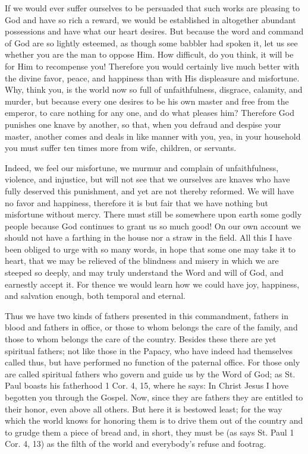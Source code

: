 If we would ever suffer ourselves to be persuaded that such works are
pleasing to God and have so rich a reward, we would be established in
altogether abundant possessions and have what our heart desires. But
because the word and command of God are so lightly esteemed, as though
some babbler had spoken it, let us see whether you are the man to
oppose Him. How difficult, do you think, it will be for Him to
recompense you! Therefore you would certainly live much better with the
divine favor, peace, and happiness than with His displeasure and
misfortune. Why, think you, is the world now so full of unfaithfulness,
disgrace, calamity, and murder, but because every one desires to be his
own master and free from the emperor, to care nothing for any one, and
do what pleases him? Therefore God punishes one knave by another, so
that, when you defraud and despise your master, another comes and deals
in like manner with you, yea, in your household you must suffer ten
times more from wife, children, or servants.

Indeed, we feel our misfortune, we murmur and complain of
unfaithfulness, violence, and injustice, but will not see that we
ourselves are knaves who have fully deserved this punishment, and yet
are not thereby reformed. We will have no favor and happiness,
therefore it is but fair that we have nothing but misfortune without
mercy. There must still be somewhere upon earth some godly people
because God continues to grant us so much good! On our own account we
should not have a farthing in the house nor a straw in the field. All
this I have been obliged to urge with so many words, in hope that some
one may take it to heart, that we may be relieved of the blindness and
misery in which we are steeped so deeply, and may truly understand the
Word and will of God, and earnestly accept it. For thence we would
learn how we could have joy, happiness, and salvation enough, both
temporal and eternal.

Thus we have two kinds of fathers presented in this commandment,
fathers in blood and fathers in office, or those to whom belongs the
care of the family, and those to whom belongs the care of the country.
Besides these there are yet spiritual fathers; not like those in the
Papacy, who have indeed had themselves called thus, but have performed
no function of the paternal office. For those only are called spiritual
fathers who govern and guide us by the Word of God; as St. Paul boasts
his fatherhood 1 Cor. 4, 15, where he says: In Christ Jesus I hove
begotten you through the Gospel. Now, since they are fathers they are
entitled to their honor, even above all others. But here it is bestowed
least; for the way which the world knows for honoring them is to drive
them out of the country and to grudge them a piece of bread and, in
short, they must be (as says St. Paul 1 Cor. 4, 13) as the filth of the
world and everybody's refuse and footrag.

